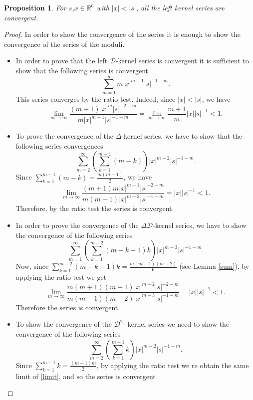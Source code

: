 \documentclass[reqno,11pt]{amsart}
\numberwithin{equation}{section}
\newtheorem{proposition}[theorem]{Proposition}
\theoremstyle{definition}
\begin{document}
\begin{proposition}
\label{conve}
For $s$,$x\in\mathbb R^6$ with $|x|<|s|$, all the left kernel series are convergent.
\end{proposition}
\begin{proof}
In order to show the convergence of the series it is enough to show the convergence of the series of the moduli.	
\begin{itemize}
\item In order to prove that the left $ \mathcal{D}$-kernel series is convergent it is sufficient to show that the following series is convergent
\begin{equation}
\label{abs3}
\sum_{m=1}^{\infty}m|x|^{m-1} |s|^{-1-m}.
\end{equation}
This series converges by the ratio test. Indeed, since  $|x|<|s|$, we have
$$\lim_{m\to\infty}\frac{(m+1)|x|^m|s|^{-2-m}}{m|x|^{m-1}|s|^{-1-m}}=\lim_{m\to \infty}\frac{m+1}{m}|x||s|^{-1}<1.$$
\item To prove the convergence of the $\Delta$-kernel series, we have to show that the following series convergences
\begin{equation}
\label{abs4}
\sum_{m=2}^\infty \left(\sum_{k=1}^{m-1} (m-k) \right)|x|^{m-2}|s|^{-1-m}.
\end{equation}
Since $\sum_{k=1}^{m-1}( m-k)=\frac{m(m-1)}{2}$, we have
\begin{equation}
\label{limit}
\lim_{m\to\infty}\frac{(m+1)m|x|^{m-1}|s|^{-2-m}}{m(m-1)|x|^{m-2}|s|^{-1-m}}=|x||s|^{-1}<1.
\end{equation}
Therefore, by the ratio test the series is convergent.
\item
In order to prove the convergence of the $\Delta \mathcal{D}$-kernel series, we have to show the convergence of the following series
\begin{equation}
\label{abs5}
\sum_{m=1}^{\infty}\left(\sum_{k=1}^{m-2}(m-k-1)k\right) |x|^{m-3}|s|^{-1-m}.
\end{equation}
Now, since $\sum_{k=1}^{m-2}(m-k-1)k=\frac{m(m-1)(m-2)}{6}$ (see Lemma \ref{sum}), by applying the ratio test we get
$$
\lim_{m\to\infty}\frac{m(m+1)(m-1)|x|^{m-2}|s|^{-2-m}}{m(m-1)(m-2) |x|^{m-3}|s|^{-1-m}}=|x||s|^{-1}<1.
$$
Therefore the series is convergent.
\item To show the convergence of the $ \mathcal{D}^2$- kernel series we need to show the convergence of the following series
$$ \sum_{m=2}^{\infty} \left( \sum_{k=1}^{m-1} k\right) |x|^{m-2} |s|^{-1-m}.$$
Since $ \sum_{k=1}^{m-1} k= \frac{(m-1)m}{2}$, by applying the ratio test we re obtain the same limit of \eqref{limit}, and so the series is convergent

\end{itemize}
\end{proof}
\end{document}
